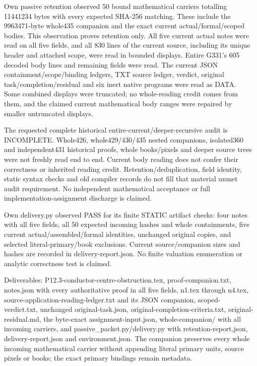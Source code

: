\documentclass[11pt]{article}
\begin{document}
Own passive retention observed 50 bound mathematical carriers totalling
11441234 bytes with every expected SHA-256 matching. These include the
9963471-byte whole435 companion and the exact current actual/formal/scoped
bodies. This observation proves retention only. All five current actual
notes were read on all five fields, and all 830 lines of the current source,
including its unique header and attached scope, were read in bounded
displays. Entire G331's 605 decoded body lines and remaining fields were
read. The current JSON containment/scope/binding ledgers, TXT source ledger,
verdict, original task/completion/residual and six inert native programs
were read as DATA. Some combined displays were truncated; no whole-reading
credit comes from them, and the claimed current mathematical body ranges
were repaired by smaller untruncated displays.

The requested complete historical entire-current/deeper-recursive audit is
INCOMPLETE. Whole426, whole429/430/435 nested companions, isolated360 and
independent431 historical proofs, whole books/pixels and deeper source trees
were not freshly read end to end. Current body reading does not confer
their correctness or inherited reading credit. Retention/deduplication,
field identity, static syntax checks and old compiler records do not fill
that material unmet audit requirement. No independent mathematical
acceptance or full implementation-assignment discharge is claimed.

Own delivery.py observed PASS for its finite STATIC artifact checks:
four notes with all five fields, all 50 expected incoming hashes and whole
containments, five current actual/assembled/formal identities, unchanged
original copies, and selected literal-primary/book exclusions. Current
source/companion sizes and hashes are recorded in delivery-report.json.
No finite valuation enumeration or analytic correctness test is claimed.

Deliverables: P12.3-conductor-centre-obstruction.tex, proof-companion.txt,
notes.json with every authoritative proof in all five fields, n1.tex through
n4.tex, source-application-reading-ledger.txt and its JSON companion,
scoped-verdict.txt, unchanged original-task.json,
original-completion-criteria.txt, original-residual.md, the byte-exact
assignment-input.json, whole-companion/ with all incoming carriers, and
passive_packet.py/delivery.py with retention-report.json,
delivery-report.json and environment.json. The companion preserves every
whole incoming mathematical carrier without appending literal primary
units, source pixels or books; the exact primary bindings remain metadata.
\end{document}
